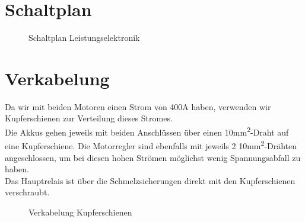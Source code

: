 \section{Schaltplan}
\begin{figure}[H]
    
    \caption{Schaltplan Leistungselektronik}
\end{figure}

\clearpage
\section{Verkabelung}
Da wir mit beiden Motoren einen Strom von 400A haben, verwenden wir Kupferschienen zur Verteilung dieses Stromes.\\
Die Akkus gehen jeweils mit beiden Anschlüssen über einen 10mm\textsuperscript{2}-Draht auf eine Kupferschiene. Die Motorregler sind ebenfalls mit jeweils 2 10mm\textsuperscript{2}-Drähten angeschlossen, um bei diesen hohen Strömen möglichst wenig Spannungsabfall zu haben.\\
Das Hauptrelais ist über die Schmelzsicherungen direkt mit den Kupferschienen verschraubt.
\begin{figure}[H]
    \caption{Verkabelung Kupferschienen}
\end{figure}



\clearpage